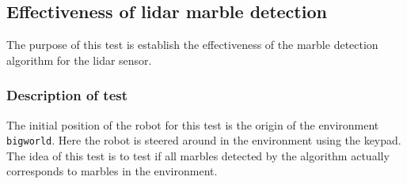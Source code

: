 \documentclass[../Head/Main.tex]{subfiles}
\begin{document}
\subsection{Effectiveness of lidar marble detection}

The purpose of this test is establish the effectiveness of the marble detection algorithm for the lidar sensor.

\subsubsection{Description of test}
The initial position of the robot for this test is the origin of the environment \texttt{bigworld}. Here the robot is steered around in the environment using the keypad. The idea of this test is to test if all marbles detected by the algorithm actually corresponds to marbles in the environment.     
\end{document}
